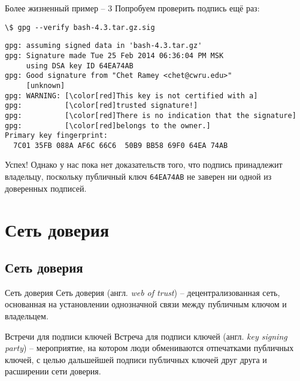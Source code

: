 \documentclass[presentation]{beamer}
\begin{document}
\begin{frame}[fragile]{Более жизненный пример -- 3}
  Попробуем проверить подпись ещё раз:
  \begin{Verbatim}[commandchars=\\\[\]]
\$ gpg --verify bash-4.3.tar.gz.sig
  \end{Verbatim}
  \footnotesize
  \begin{Verbatim}[commandchars=\\\[\]]
gpg: assuming signed data in 'bash-4.3.tar.gz'
gpg: Signature made Tue 25 Feb 2014 06:36:04 PM MSK
     using DSA key ID 64EA74AB
gpg: Good signature from "Chet Ramey <chet@cwru.edu>"
     [unknown]
gpg: WARNING: [\color[red]This key is not certified with a]
gpg:          [\color[red]trusted signature!]
gpg:          [\color[red]There is no indication that the signature]
gpg:          [\color[red]belongs to the owner.]
Primary key fingerprint:
  7C01 35FB 088A AF6C 66C6  50B9 BB58 69F0 64EA 74AB
  \end{Verbatim}
  \normalsize

  \vspace{5 mm}

  Успех!  Однако у нас пока нет доказательств того, что подпись
  принадлежит владельцу, поскольку публичный ключ \texttt{64EA74AB} не
  заверен ни одной из доверенных подписей.
\end{frame}




\section{Сеть доверия}

\subsection{Сеть доверия}

\begin{frame}{Сеть доверия}
  \raisebox{-.30em}{\Large\HandRight}\hspace{.25em} Сеть доверия
  (англ. \emph{web of trust}) -- децентрализованная сеть, основанная
  на установлении однозначной связи между публичным ключом и
  владельцем.
\end{frame}

\begin{frame}{Встречи для подписи ключей}
  \raisebox{-.30em}{\Large\HandRight}\hspace{.25em} Встреча для
  подписи ключей (англ. \emph{key signing party}) -- мероприятие, на
  котором люди обмениваются отпечатками публичных ключей, с целью
  дальшейшей подписи публичных ключей друг друга и расширении сети
  доверия.
\end{frame}
\end{document}
